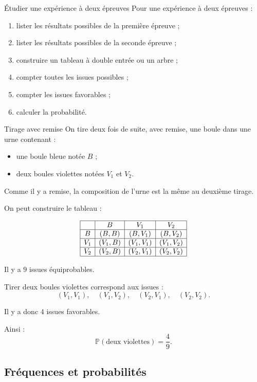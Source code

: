 \documentclass[11pt,a4paper]{article}
\newcommand{\Prob}{\mathbb{P}}
\begin{document}
\begin{methodbox}{Étudier une expérience à deux épreuves}
Pour une expérience à deux épreuves :
\begin{enumerate}
    \item lister les résultats possibles de la première épreuve ;
    \item lister les résultats possibles de la seconde épreuve ;
    \item construire un tableau à double entrée ou un arbre ;
    \item compter toutes les issues possibles ;
    \item compter les issues favorables ;
    \item calculer la probabilité.
\end{enumerate}
\end{methodbox}

\begin{examplebox}{Tirage avec remise}
On tire deux fois de suite, avec remise, une boule dans une urne contenant :
\begin{itemize}
    \item une boule bleue notée $B$ ;
    \item deux boules violettes notées $V_1$ et $V_2$.
\end{itemize}

Comme il y a remise, la composition de l'urne est la même au deuxième tirage.

On peut construire le tableau :

\[
\begin{array}{|c|c|c|c|}
\hline
 & B & V_1 & V_2 \\
\hline
B & (B,B) & (B,V_1) & (B,V_2) \\
\hline
V_1 & (V_1,B) & (V_1,V_1) & (V_1,V_2) \\
\hline
V_2 & (V_2,B) & (V_2,V_1) & (V_2,V_2) \\
\hline
\end{array}
\]

Il y a $9$ issues équiprobables.

Tirer deux boules violettes correspond aux issues :
\[
(V_1,V_1),\quad (V_1,V_2),\quad (V_2,V_1),\quad (V_2,V_2).
\]

Il y a donc $4$ issues favorables.

Ainsi :
\[
\Prob(\text{deux violettes})=\frac{4}{9}.
\]
\end{examplebox}

\subsection{Fréquences et probabilités}
\end{document}
